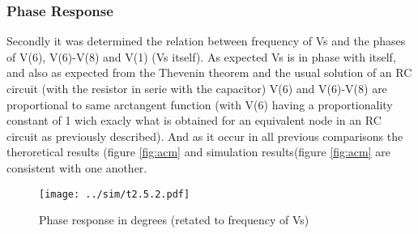\subsubsection{Phase Response}

Secondly it was determined the relation between frequency of Vs and the phases of V(6), V(6)-V(8) and V(1) (Vs itself). As expected Vs is in phase with itself, and also as expected from the Thevenin theorem  and the usual solution of an RC circuit (with the resistor in serie with the capacitor) V(6) and V(6)-V(8) are proportional to same arctangent function (with V(6) having a proportionality constant of 1 wich exacly what is obtained for an equivalent node in an RC circuit as previously described). And as it occur in all previous comparisons the theroretical results (figure \ref{fig:acm} and simulation results(figure \ref{fig:acm} are consistent with one another.

\begin{figure}[h] \centering
\texttt{[image: ../sim/t2.5.2.pdf]}
\caption{Phase response in degrees (retated to frequency of Vs)}
\label{fig:acp}
\end{figure}








